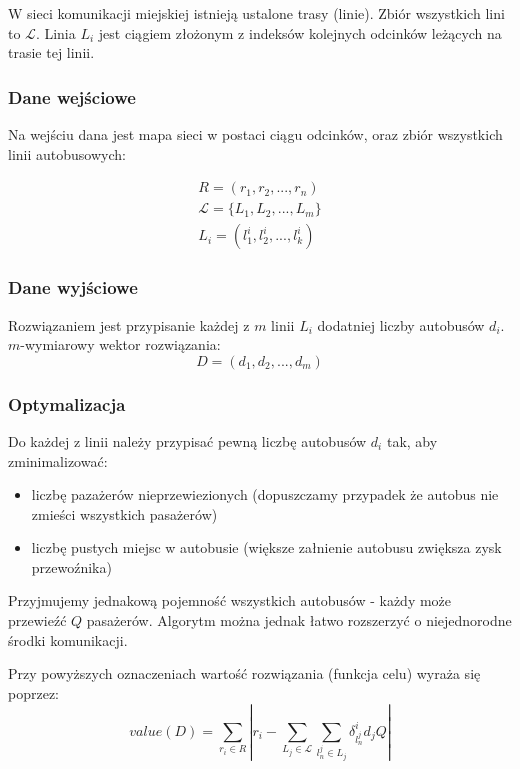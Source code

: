 \documentclass[a4paper]{article}
\begin{document}
W sieci komunikacji miejskiej istnieją ustalone trasy (linie). Zbiór wszystkich lini to $\mathcal{L}$. Linia $L_i$ jest ciągiem złożonym z indeksów kolejnych odcinków leżących na trasie tej linii.

\subsubsection{Dane wejściowe}
Na wejściu dana jest mapa sieci w postaci ciągu odcinków, oraz zbiór wszystkich linii autobusowych:

\begin{eqnarray}
R = (r_1, r_2, ..., r_n) \nonumber \\
\mathcal{L} = \{L_1, L_2, ..., L_m\} \\
L_i = (l_1^i, l_2^i, ..., l_k^i) \nonumber
\end{eqnarray}

\subsubsection{Dane wyjściowe}
Rozwiązaniem jest przypisanie każdej z $m$ linii $L_i$ dodatniej liczby autobusów $d_i$. $m$-wymiarowy wektor rozwiązania:
\begin{equation}
D = (d_1, d_2, ..., d_m)
\end{equation}

\subsubsection{Optymalizacja}
Do każdej z linii należy przypisać pewną liczbę autobusów $d_i$ tak, aby zminimalizować:
\begin{itemize}
	\item liczbę pazażerów nieprzewiezionych (dopuszczamy przypadek że autobus nie zmieści wszystkich pasażerów)
	\item liczbę pustych miejsc w autobusie (większe załnienie autobusu zwiększa zysk przewoźnika)
\end{itemize}

Przyjmujemy jednakową pojemność wszystkich autobusów - każdy może przewieźć $Q$ pasażerów. Algorytm można jednak łatwo rozszerzyć o niejednorodne środki komunikacji.

Przy powyższych oznaczeniach wartość rozwiązania (funkcja celu) wyraża się poprzez:
\begin{equation}
value(D) = \sum_{r_i \in R}|
	r_i - \sum_{L_j \in \mathcal{L}}\sum_{l_n^j \in L_j} \delta_{l_n^j}^i d_j Q
| 
\end{equation}
\end{document}
